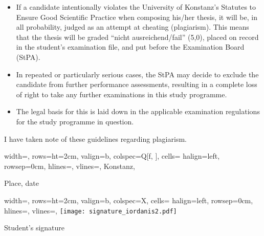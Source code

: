 {\begin{itemize}[label=\color{kon4}--, leftmargin=1.45cm, labelsep=0.45cm]
\item If a candidate intentionally violates the University of Konstanz's Statutes to Ensure Good Scientific Practice when composing his/her thesis, it will be, in all probability, judged as an attempt at cheating (plagiarism). This means that the thesis will be graded \enquote{nicht ausreichend/fail} (5,0), placed on record in the student's examination file, and put before the Examination Board (StPA).

\item In repeated or particularly serious cases, the StPA may decide to exclude the candidate from further performance assessments, resulting in a complete loss of right to take any further examinations in this study programme.

\item The legal basis for this is laid down in the applicable examination regulations for the study programme in question.
\end{itemize}

I have taken note of these guidelines regarding plagiarism.

\vspace{0.75cm}

\begin{minipage}{0.3\textwidth}

    \begin{tblr}{
        width=\linewidth,
        rows={ht=2cm, valign=b},
        colspec={Q[f, \linewidth]},
        cells= {halign=left},
        rowsep=0cm,
        hlines={},
        vlines={},
    }
   Konstanz, \@submitdate\\
    \end{tblr}

    \vspace{0.1cm}

    Place, date
\end{minipage}\begin{minipage}{0.1\textwidth}
     \phantom{a}
\end{minipage}\begin{minipage}{0.6\textwidth}
    \begin{tblr}{
        width=\linewidth,
        rows={ht=2cm, valign=b},
        colspec={X},
        cells= {halign=left},
        rowsep=0cm,
        hlines={},
        vlines={},
    }
   \texttt{[image: signature\_iordanis2.pdf]}\\
    \end{tblr}

    \vspace{0.1cm}

    \raggedleft Student's signature
\end{minipage}
}
\newpage
\restoregeometry